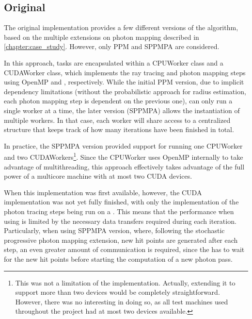 \documentclass[main.tex]{subfiles}
\begin{document}
\subsection{Original} \label{section:impl_original}

The original implementation provides a few different versions of the algorithm, based on the multiple extensions on photon mapping described in \cref{chapter:case_study}. However, only PPM and SPPMPA are considered.

In this approach, tasks are encapsulated within a CPUWorker class and a CUDAWorker class, which implements the ray tracing and photon mapping steps using \acs{OpenMP} and \cuda, respectively. While the initial PPM version, due to implicit dependency limitations (without the probabilistic approach for radius estimation, each photon mapping step is dependent on the previous one), can only run a single worker at a time, the later version (SPPMPA) allows the instantiation of multiple workers. In that case, each worker will share access to a centralized structure that keeps track of how many iterations have been finished in total.

In practice, the SPPMPA version provided support for running one CPUWorker and two CUDAWorkers\footnote{This was not a limitation of the implementation. Actually, extending it to support more than two \cuda devices would be completely straightforward. However, there was no interesting in doing so, as all test machines used throughout the project had at most two \cuda devices available.}. Since the CPUWorker uses \acs{OpenMP} internally to take advantage of multithreading, this approach effectively takes advantage of the full power of a multicore machine with at most two \acs{CUDA} devices.

When this implementation was first available, however, the \acs{CUDA} implementation was not yet fully finished, with only the implementation of the photon tracing steps being run on a \gpu. This means that the performance when using \cuda is limited by the necessary data transfers required during each iteration. Particularly, when using SPPMPA version, where, following the stochastic progressive photon mapping extension, new hit points are generated after each step, an even greater amount of communication is required, since the \gpu has to wait for the new hit points before starting the computation of a new photon pass.


\end{document}

